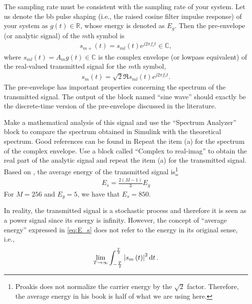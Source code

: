 \documentclass[12pt,a4paper]{article}
\begin{document}
The sampling rate must be consistent with the sampling rate of your system. Let us denote the \gls{bb} pulse shaping (i.e., the raised cosine filter impulse response) of your system as \(g\left( t \right) \in \mathbb{R}\), whose energy is denoted as \(E_g\). Then the pre-envelope (or analytic signal) of the \(m\)th symbol is
\begin{align}
    s_{m+}\left( t \right) = s_{ml}\left( t \right) e^{j 2\pi f_c t} \in \mathbb{C},
\end{align}
where \(s_{ml}\left( t \right) = A_m g\left( t \right) \in \mathbb{C}\) is the complex envelope (or lowpass equivalent) of the real-valued transmitted signal for the \(m\)th symbol,
\begin{align}
    \label{eq:s_m(t)}
    s_{m}\left( t \right) = \sqrt{2} \Re{s_{ml}\left( t \right) e^{j 2\pi f_c t}}.
\end{align}
The pre-envelope has important properties concerning the spectrum of the transmitted signal. The output of the block named ``sine wave'' should exactly be the discrete-time version of the pre-envelope discussed in the literature.

\subproblem Make a mathematical analysis of this signal and use the ``Spectrum Analyzer'' block to compare the spectrum obtained in Simulink with the theoretical spectrum. Good references can be found in \cite{mengaliSynchronizationTechniquesDigital1997,meyrDigitalCommunicationReceivers1998,proakisDigitalCommunications2007}
\subproblem Repeat the item (a) for the spectrum of the complex envelope.
\subproblem Use a block called ``Complex to real-imag'' to obtain the real part of the analytic signal and repeat the item (a) for the transmitted signal.
\subproblem Based on \cite[Equation (3.2-42)]{proakisDigitalCommunications2007}, the average energy of the transmitted signal is\footnote{Proakis does not normalize the carrier energy by the \(\sqrt{2}\) factor. Therefore, the average energy in his book is half of what we are using here.}
\begin{align}
    \label{eq:E_s}
    E_s = \frac{2\left( M-1 \right)}{3}E_g
\end{align}
For \(M = 256\) and \(E_g = 5\), we have that \(E_s = 850\).

In reality, the transmitted signal is a stochastic process and therefore it is seen as a power signal since its energy is infinity. However, the concept of ``average energy'' expressed in \eqref{eq:E_s} does not refer to the energy in its original sense, i.e.,
\begin{align}
    \lim_{T \rightarrow \infty} \int_{-\frac{T}{2}}^{\frac{T}{2}} \abs{s_m \left( t \right)}^{2} \dd{t}.
\end{align}
\end{document}

